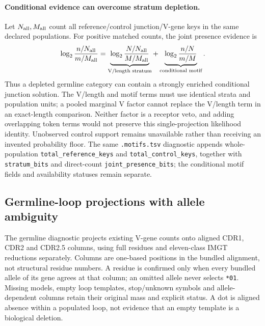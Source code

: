 \documentclass[10pt,a4paper]{article}
\theoremstyle{definition}
\begin{document}
\paragraph{Conditional evidence can overcome stratum depletion.}
Let $N_{\rm all},M_{\rm all}$ count all reference/control junction/V-gene keys in the same declared populations.
For positive matched counts, the joint presence evidence is
\[
 \log_2\frac{n/N_{\rm all}}{m/M_{\rm all}}
 =\underbrace{\log_2\frac{N/N_{\rm all}}{M/M_{\rm all}}}_{\text{V/length stratum}}
 +\underbrace{\log_2\frac{n/N}{m/M}}_{\text{conditional motif}}.
\]
Thus a depleted germline category can contain a strongly enriched conditional junction solution.
The V/length and motif terms must use identical strata and population units; a pooled marginal V factor cannot replace the V/length term in an exact-length comparison.
Neither factor is a receptor veto, and adding overlapping token terms would not preserve this single-projection likelihood identity.
Unobserved control support remains unavailable rather than receiving an invented probability floor.
The same \texttt{.motifs.tsv} diagnostic appends whole-population \texttt{total\_reference\_keys} and \texttt{total\_control\_keys}, together with \texttt{stratum\_bits} and direct-count \texttt{joint\_presence\_bits}; the conditional motif fields and availability statuses remain separate.

\subsection{Germline-loop projections with allele ambiguity}
The germline diagnostic projects existing V-gene counts onto aligned CDR1, CDR2 and CDR2.5 columns, using full residues and eleven-class IMGT reductions separately.
Columns are one-based positions in the bundled alignment, not structural residue numbers.
A residue is confirmed only when every bundled allele of its gene agrees at that column; an omitted allele never selects \texttt{*01}.
Missing models, empty loop templates, stop/unknown symbols and allele-dependent columns retain their original mass and explicit status.
A dot is aligned absence within a populated loop, not evidence that an empty template is a biological deletion.
\end{document}
